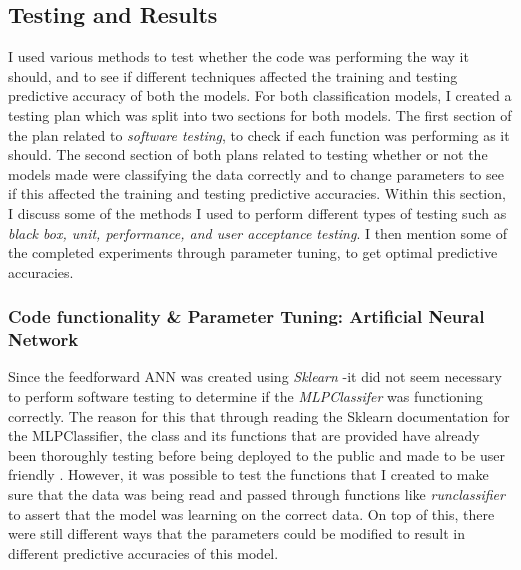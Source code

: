 \documentclass[11pt]{article}
\begin{document}
\subsection{Testing and Results}
I used various methods to test whether the code was performing the way it should, and to see if different techniques affected the training and testing predictive accuracy of both the models. For both classification models, I created a testing plan which was split into two sections for both models. The first section of the plan related to \textit{software testing}, to check if each function was performing as it should. The second section of both plans related to testing whether or not the models made were classifying the data correctly and to change parameters to see if this affected the training and testing predictive accuracies. Within this section, I discuss some of the methods I used to perform different types of testing such as \textit{black box, unit, performance, and user acceptance testing}. I then mention some of the completed experiments through parameter tuning, to get optimal predictive accuracies. 
\subsubsection{Code functionality \& Parameter Tuning: Artificial Neural Network}
Since the feedforward ANN was created using \textit{Sklearn} -it did not seem necessary to perform software testing to determine if the \textit{MLPClassifer} was functioning correctly. The reason for this that through reading the Sklearn documentation for the MLPClassifier, the class and its functions that are provided have already been thoroughly testing before being deployed to the public and made to be user friendly \cite{?}. However, it was possible to test the functions that I created to make sure that the data was being read and passed through functions like \textit{run\textunderscore classifier} to assert that the model was learning on the correct data. On top of this, there were still different ways that the parameters could be modified to result in different predictive accuracies of this model. 
\end{document}
